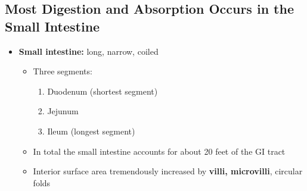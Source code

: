 \documentclass[12pt]{article}
\begin{document}
        \subsection{Most Digestion and Absorption Occurs in the Small Intestine}
            \begin{itemize}
                \item \textbf{Small intestine:} long, narrow, coiled
                    \begin{itemize}
                        \item Three segments:
                            \begin{enumerate}
                                \item Duodenum (shortest segment)
                                \item Jejunum
                                \item Ileum (longest segment)
                            \end{enumerate}
                        \item In total the small intestine accounts for about 20 feet of the GI tract
                        \item Interior surface area tremendously increased by \textbf{villi, microvilli}, circular folds
                    \end{itemize}
            \end{itemize}
\end{document}
